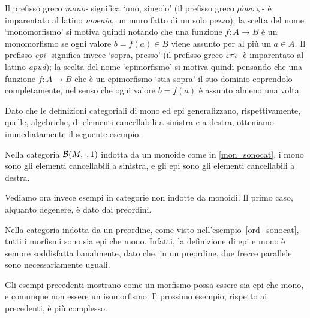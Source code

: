 \begin{terminology}
	Il prefisso greco \emph{mono-} significa `uno, singolo' (il prefisso greco \(\mu\acute{o}\nu o\varsigma\)- è imparentato al latino \emph{moenia}, un muro fatto di un solo pezzo); la scelta del nome `monomorfismo' si motiva quindi notando che una funzione \(f : A\to B\) è un monomorfismo se ogni valore \(b=f(a) \in B\) viene assunto per al più un \(a\in A\). Il prefisso \emph{epi-} significa invece `sopra, presso' (il prefisso greco \(\overset,\varepsilon\pi\acute{\iota}\)- è imparentato al latino \emph{apud}); la scelta del nome `epimorfismo' si motiva quindi pensando che una funzione \(f : A\to B\) che è un epimorfismo `stia sopra' il suo dominio coprendolo completamente, nel senso che ogni valore \(b=f(a)\) è assunto almeno una volta.
\end{terminology}
Dato che le definizioni categoriali di mono ed epi generalizzano, rispettivamente, quelle, algebriche, di elementi cancellabili a sinistra e a destra, otteniamo immediatamente il seguente esempio.
\begin{example}
	Nella categoria \(\mathcal{B}(M,\cdot,1)\) indotta da un monoide come in \ref{mon_sonocat}, i mono sono gli elementi cancellabili a sinistra,
	e gli epi sono gli elementi cancellabili a destra.
\end{example}
Vediamo ora invece esempi in categorie non indotte da monoidi. Il primo caso, alquanto degenere, è dato dai preordini.
\begin{example}\label{ex:mono-epi-preord}
	Nella categoria indotta da un preordine, come visto nell'esempio~\ref{ord_sonocat}, tutti i morfismi sono sia epi che mono. Infatti, la definizione di epi e mono è sempre soddisfatta banalmente, dato che, in un preordine, due frecce parallele sono necessariamente uguali.
\end{example}
Gli esempi precedenti mostrano come un morfismo possa essere sia epi che mono, e comunque non essere un isomorfismo. Il prossimo esempio, rispetto ai precedenti, è più complesso.

